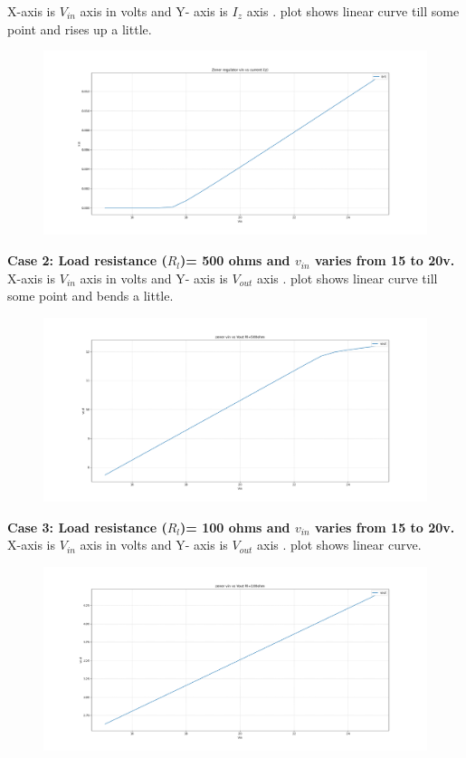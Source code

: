 \documentclass[12pt]{article}
\begin{document}
\newpage
X-axis is \(V_{in}\) axis in volts and Y- axis is \(I_{z}\) axis . plot shows linear curve till some point and rises up a little.\\
\begin{figure}[h!]
\centering
\includegraphics[scale = 0.3]{zener_current_Iz_1k.png}
\end{figure}
\newpage

\textbf{Case 2: Load resistance (\(R_{l}\))= 500 ohms and \(v_{in}\) varies from 15 to 20v.\\}
X-axis is \(V_{in}\) axis in volts and Y- axis is \(V_{out}\) axis . plot shows linear curve till some point and bends a little.\\
\begin{figure}[h!]
\centering
\includegraphics[scale = 0.3]{zener_vin_vout_500.png}
\end{figure}
\newpage

\textbf{Case 3: Load resistance (\(R_{l}\))= 100 ohms and \(v_{in}\) varies from 15 to 20v.\\}
X-axis is \(V_{in}\) axis in volts and Y- axis is \(V_{out}\) axis . plot shows linear curve.\\
\begin{figure}[h!]
\centering
\includegraphics[scale = 0.3]{zener_vin_vout_100.png}
\end{figure}
\newpage
\end{document}
